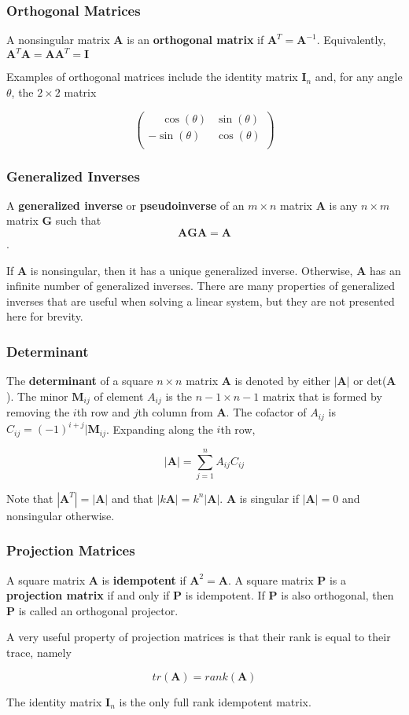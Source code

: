 \documentclass{beamer}
\begin{document}
\begin{frame}
\frametitle{Orthogonal Matrices}
A nonsingular matrix $\mathbf{A}$ is an \textbf{orthogonal matrix} if $\mathbf{A}^T = \mathbf{A}^{-1}$.  Equivalently, $\mathbf{A}^T\mathbf{A} = \mathbf{AA}^T = \mathbf{I}$   

\vspace{5mm}

Examples of orthogonal matrices include the identity matrix $\mathbf{I}_n$ and, for any angle $\theta$, the $2 \times 2$ matrix

\[
 \begin{pmatrix}
    \phantom{-}\cos (\theta) & \sin (\theta) \\
    -\sin (\theta) & \cos (\theta)  \\  
\end{pmatrix}
\]
\end{frame}

\begin{frame}
\frametitle{Generalized Inverses}
A \textbf{generalized inverse} or \textbf{pseudoinverse} of an $m \times n$ matrix $\mathbf{A}$ is any $n \times m$ matrix $\mathbf{G}$ such that $$\mathbf{AGA} = \mathbf{A}$$.  

If $\mathbf{A}$ is nonsingular, then it has a unique generalized inverse.  Otherwise, $\mathbf{A}$ has an infinite number of generalized inverses.  There are many properties of generalized inverses that are useful when solving a linear system, but they are not presented here for brevity. 
\end{frame}

\begin{frame}
\frametitle{Determinant}
The \textbf{determinant} of a square $n \times n$ matrix $\mathbf{A}$ is denoted by either $|\mathbf{A}|$ or det($\mathbf{A}$).  The minor $\mathbf{M}_{ij}$ of element $A_{ij}$ is the $n - 1 \times n-1$ matrix that is formed by removing the $i$th row and $j$th column from $\mathbf{A}$.  The cofactor of $A_{ij}$ is $C_{ij} = (-1)^{i + j}|\mathbf{M}_{ij}$.  Expanding along the $i$th row, 

$$|\mathbf{A}| = \sum_{j = 1}^n A_{ij}C_{ij}$$

Note that $|\mathbf{A}^T| = |\mathbf{A}|$ and that $|k\mathbf{A}| = k^n|\mathbf{A}|$.  $\mathbf{A}$ is singular if $|\mathbf{A}| = 0$ and nonsingular otherwise.
\end{frame}

\begin{frame}
\frametitle{Projection Matrices}
A square matrix $\mathbf{A}$ is \textbf{idempotent} if $\mathbf{A}^2 = \mathbf{A}$.  A square matrix $\mathbf{P}$ is a \textbf{projection matrix} if and only if $\mathbf{P}$ is idempotent.  If $\mathbf{P}$ is also orthogonal, then $\mathbf{P}$ is called an orthogonal projector.

\vspace{5mm}

A very useful property of projection matrices is that their rank is equal to their trace, namely

\[tr(\mathbf{A}) = rank(\mathbf{A})\]

The identity matrix $\mathbf{I}_n$ is the only full rank idempotent matrix.  
\end{frame}
\end{document}
